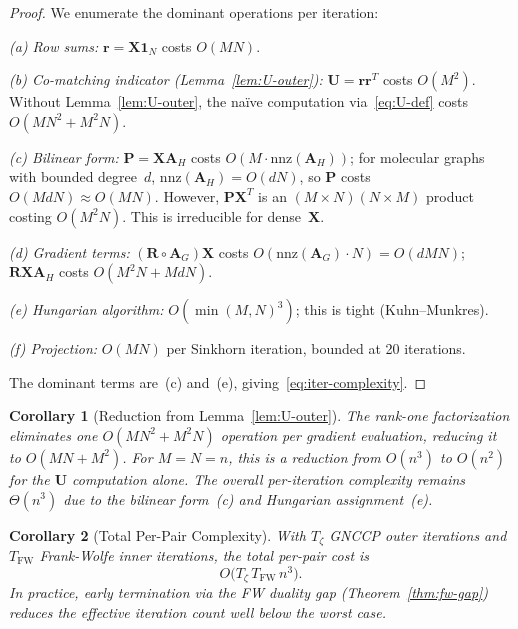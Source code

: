 \documentclass[conference]{IEEEtran}
\newtheorem{corollary}{Corollary}
\begin{document}
\begin{proof}
We enumerate the dominant operations per iteration:

\smallskip\noindent
\emph{(a) Row sums:}
$\mathbf{r} = \mathbf{X}\mathbf{1}_N$ costs $O(MN)$.

\smallskip\noindent
\emph{(b) Co-matching indicator (Lemma~\ref{lem:U-outer}):}
$\mathbf{U} = \mathbf{r}\mathbf{r}^T$ costs $O(M^2)$.
Without Lemma~\ref{lem:U-outer}, the na\"ive computation
via~\eqref{eq:U-def} costs $O(MN^2 + M^2 N)$.

\smallskip\noindent
\emph{(c) Bilinear form:}
$\mathbf{P} = \mathbf{X}\mathbf{A}_H$ costs $O(M \cdot \mathrm{nnz}(\mathbf{A}_H))$;
for molecular graphs with bounded degree~$d$,
$\mathrm{nnz}(\mathbf{A}_H) = O(dN)$,
so $\mathbf{P}$ costs $O(MdN) \approx O(MN)$.
However, $\mathbf{P}\mathbf{X}^T$ is an
$(M\!\times\!N)(N\!\times\!M)$ product costing $O(M^2 N)$.
This is irreducible for dense~$\mathbf{X}$.

\smallskip\noindent
\emph{(d) Gradient terms:}
$({\mathbf{R}\!\circ\!\mathbf{A}_G})\mathbf{X}$ costs
$O(\mathrm{nnz}(\mathbf{A}_G)\!\cdot\!N) = O(dMN)$;
$\mathbf{R}\mathbf{X}\mathbf{A}_H$ costs $O(M^2 N + MdN)$.

\smallskip\noindent
\emph{(e) Hungarian algorithm:}
$O(\min(M,N)^3)$; this is tight (Kuhn--Munkres).

\smallskip\noindent
\emph{(f) Projection:}
$O(MN)$ per Sinkhorn iteration, bounded at 20 iterations.

\smallskip\noindent
The dominant terms are~(c) and~(e), giving~\eqref{eq:iter-complexity}.
\end{proof}

\begin{corollary}[Reduction from Lemma~\ref{lem:U-outer}]
\label{cor:reduction}
The rank-one factorization eliminates one $O(MN^2 + M^2 N)$
operation per gradient evaluation, reducing it to $O(MN + M^2)$.
For $M \!=\! N \!=\! n$, this is a reduction from $O(n^3)$ to $O(n^2)$
for the $\mathbf{U}$ computation alone.
The overall per-iteration complexity remains
$\Theta(n^3)$ due to the bilinear form~(c) and
Hungarian assignment~(e).
\end{corollary}

\begin{corollary}[Total Per-Pair Complexity]
\label{cor:total}
With $T_\zeta$ GNCCP outer iterations and $T_{\mathrm{FW}}$
Frank-Wolfe inner iterations, the total per-pair cost is
\begin{equation}
O\!\bigl(T_\zeta\, T_{\mathrm{FW}}\, n^3\bigr).
\label{eq:total-complexity}
\end{equation}
In practice, early termination via the FW duality gap
(Theorem~\ref{thm:fw-gap}) reduces the effective
iteration count well below the worst case.
\end{corollary}
\end{document}
